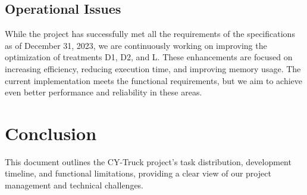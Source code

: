\documentclass[11pt]{article}
\begin{document}
\subsection{Operational Issues}
While the project has successfully met all the requirements of the specifications as of December 31, 2023, we are continuously working on improving the optimization of treatments D1, D2, and L. These enhancements are focused on increasing efficiency, reducing execution time, and improving memory usage. The current implementation meets the functional requirements, but we aim to achieve even better performance and reliability in these areas.



\section{Conclusion}
This document outlines the CY-Truck project's task distribution, development timeline, and functional limitations, providing a clear view of our project management and technical challenges.
\end{document}

